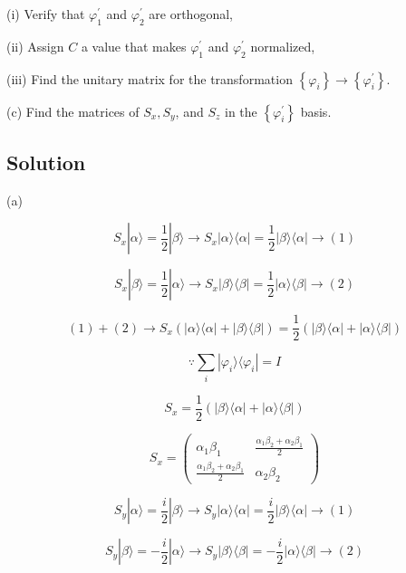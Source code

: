 \documentclass[12pt]{article}
\begin{document}
(i) Verify that \(\varphi_1^{\prime}\) and \(\varphi_2^{\prime}\) are orthogonal,

(ii) Assign \(C\) a value that makes \(\varphi_1^{\prime}\) and \(\varphi_2^{\prime}\) normalized,

(iii) Find the unitary matrix for the transformation \(\left\{\varphi_i\right\} \rightarrow\left\{\varphi_i^{\prime}\right\}\).

(c) Find the matrices of \(S_x, S_y\), and \(S_z\) in the \(\left\{\varphi_i^{\prime}\right\}\) basis.

\subsection{Solution}

(a)

\[
    S_x | \alpha \rangle = \frac{1}{2} | \beta \rangle
    \rightarrow  S_x | \alpha \rangle \langle \alpha |
    = \frac{1}{2} | \beta \rangle \langle \alpha | \longrightarrow (1)
\]

\[
    S_x | \beta \rangle = \frac{1}{2} | \alpha \rangle
    \rightarrow  S_x | \beta \rangle \langle \beta |
    = \frac{1}{2} | \alpha \rangle \langle \beta | \longrightarrow (2)
\]

\[
    (1) + (2) \longrightarrow S_x (| \alpha \rangle \langle \alpha | + | \beta \rangle \langle \beta |)
    = \frac{1}{2} (| \beta \rangle \langle \alpha | + | \alpha \rangle \langle \beta |)
\]

\[
    \because \sum_i | \varphi_i \rangle \langle \varphi_i | = I
\]

\[
    S_x = \frac{1}{2} (| \beta \rangle \langle \alpha | + | \alpha \rangle \langle \beta |)
\]

\[
    S_x =
    \begin{pmatrix}
        \alpha_1\beta_1                             & \frac{\alpha_1\beta_2 + \alpha_2\beta_1}{2} \\
        \frac{\alpha_1\beta_2 + \alpha_2\beta_1}{2} & \alpha_2\beta_2
    \end{pmatrix}
\]

\[
    S_y | \alpha \rangle = \frac{i}{2} | \beta \rangle
    \rightarrow  S_y | \alpha \rangle \langle \alpha |
    = \frac{i}{2} | \beta \rangle \langle \alpha | \longrightarrow (1)
\]

\[
    S_y | \beta \rangle = - \frac{i}{2} | \alpha \rangle
    \rightarrow  S_y | \beta \rangle \langle \beta |
    = - \frac{i}{2} | \alpha \rangle \langle \beta | \longrightarrow (2)
\]
\end{document}
